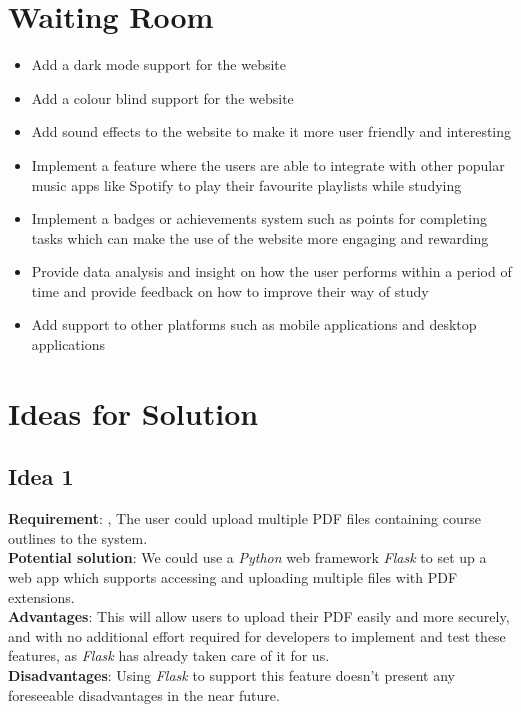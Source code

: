 \documentclass[12pt]{article}
\begin{document}
\section{Waiting Room}
\begin{itemize}
  \item Add a dark mode support for the website
  \item Add a colour blind support for the website
  \item Add sound effects to the website to make it more user friendly and interesting
  \item Implement a feature where the users are able to integrate with other popular music apps like Spotify to play their favourite playlists while studying
  \item Implement a badges or achievements system such as points for completing tasks which can make the use of the website more engaging and rewarding 
  \item Provide data analysis and insight on how the user performs within a period of time and provide feedback on how to improve their way of study
  \item Add support to other platforms such as mobile applications and desktop applications
\end{itemize}

\section{Ideas for Solution}
\subsection{Idea 1}
\textbf{Requirement}: , The user could upload multiple PDF files containing course outlines to the system. \\
\textbf{Potential solution}: We could use a \textit{Python} web framework \textit{Flask} to set up a web app which supports accessing and uploading multiple files with PDF extensions.\\
\textbf{Advantages}: This will allow users to upload their PDF easily and more securely, and with no additional effort required for developers to implement and test these features, as \textit{Flask} has already taken care of it for us.\\
\textbf{Disadvantages}: Using \textit{Flask} to support this feature doesn't present any foreseeable disadvantages in the near future. \\
\end{document}
